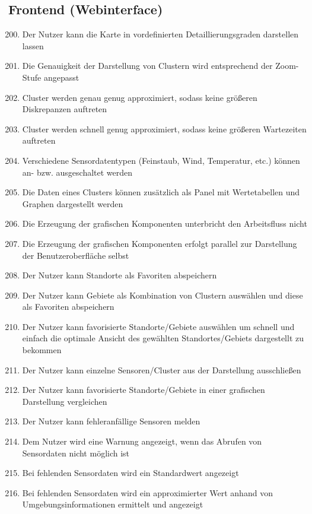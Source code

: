 \subsection{Frontend (Webinterface)}
\begin{enumerate}[label=\textbf{WK\arabic{enumi}0}]
	\setcounter{enumi}{199}
	\item Der Nutzer kann die Karte in vordefinierten Detaillierungsgraden darstellen lassen
	\item Die Genauigkeit der Darstellung von Clustern wird entsprechend der Zoom-Stufe angepasst
	\item Cluster werden genau genug approximiert, sodass keine größeren Diskrepanzen auftreten
	\item Cluster werden schnell genug approximiert, sodass keine größeren Wartezeiten auftreten
	\item Verschiedene Sensordatentypen (Feinstaub, Wind, Temperatur, etc.) können an- bzw. ausgeschaltet werden
	\item Die Daten eines Clusters können zusätzlich als Panel mit Wertetabellen und Graphen dargestellt werden
	\item Die Erzeugung der grafischen Komponenten unterbricht den Arbeitsfluss nicht
	\item Die Erzeugung der grafischen Komponenten erfolgt parallel zur Darstellung der Benutzeroberfläche selbst
	\item Der Nutzer kann Standorte als Favoriten abspeichern
	\item Der Nutzer kann Gebiete als Kombination von Clustern auswählen und diese als Favoriten abspeichern
	\item Der Nutzer kann favorisierte Standorte/Gebiete auswählen um schnell und einfach die optimale Ansicht des gewählten Standortes/Gebiets dargestellt zu bekommen
	\item Der Nutzer kann einzelne Sensoren/Cluster aus der Darstellung ausschließen
	\item Der Nutzer kann favorisierte Standorte/Gebiete in einer grafischen Darstellung vergleichen
	\item Der Nutzer kann fehleranfällige Sensoren melden
	\item Dem Nutzer wird eine Warnung angezeigt, wenn das Abrufen von Sensordaten nicht möglich ist
	\item Bei fehlenden Sensordaten wird ein Standardwert angezeigt
	\item Bei fehlenden Sensordaten wird ein approximierter Wert anhand von Umgebungsinformationen ermittelt und angezeigt

\end{enumerate}
